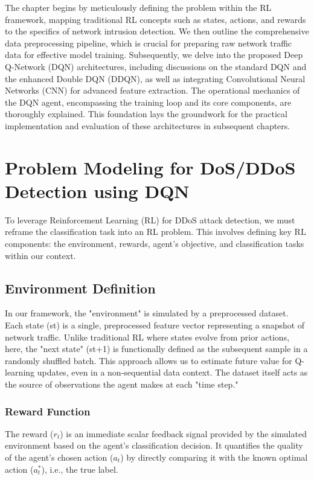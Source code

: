 \documentclass[16pt]{report}
\begin{document}
The chapter begins by meticulously defining the problem within the RL framework, mapping traditional RL concepts such as states, actions, and rewards to the specifics of network intrusion detection. We then outline the comprehensive data preprocessing pipeline, which is crucial for preparing raw network traffic data for effective model training. Subsequently, we delve into the proposed Deep Q-Network (DQN) architectures, including discussions on the standard DQN and the enhanced Double DQN (DDQN), as well as integrating Convolutional Neural Networks (CNN) for advanced feature extraction. The operational mechanics of the DQN agent, encompassing the training loop and its core components, are thoroughly explained. This foundation lays the groundwork for the practical implementation and evaluation of these architectures in subsequent chapters.

\section{Problem Modeling for DoS/DDoS Detection using DQN}

To leverage Reinforcement Learning (RL) for DDoS attack detection, we must reframe the classification task into an RL problem. This involves defining key RL components: the environment, rewards, agent's objective, and classification tasks within our context.

\subsection{Environment Definition}
In our framework, the "environment" is simulated by a preprocessed dataset. Each state (st​) is a single, preprocessed feature vector representing a snapshot of network traffic. Unlike traditional RL where states evolve from prior actions, here, the "next state" (st+1​) is functionally defined as the subsequent sample in a randomly shuffled batch. This approach allows us to estimate future value for Q-learning updates, even in a non-sequential data context. The dataset itself acts as the source of observations the agent makes at each "time step."

\subsubsection{Reward Function}

The reward ($r_t$) is an immediate scalar feedback signal provided by the simulated environment based on the agent's classification decision. It quantifies the quality of the agent’s chosen action ($a_t$) by directly comparing it with the known optimal action ($a_t^*$), i.e., the true label.
\end{document}
